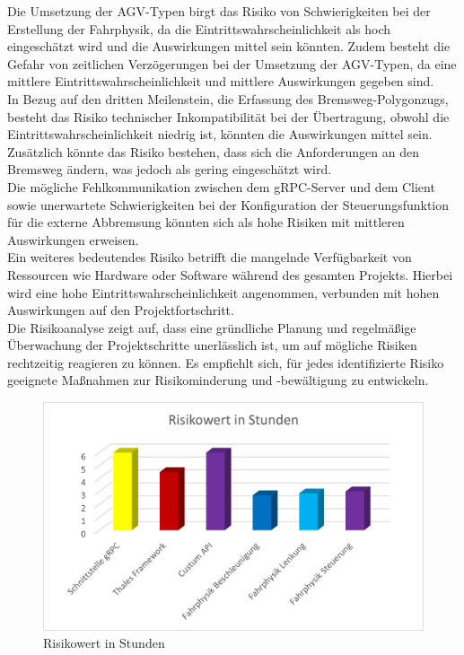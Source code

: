 Die Umsetzung der AGV-Typen birgt das Risiko von Schwierigkeiten bei der Erstellung der Fahrphysik, da die Eintrittswahrscheinlichkeit als hoch eingeschätzt wird und die Auswirkungen mittel sein könnten. Zudem besteht die Gefahr von zeitlichen Verzögerungen bei der Umsetzung der AGV-Typen, da eine mittlere Eintrittswahrscheinlichkeit und mittlere Auswirkungen gegeben sind.\\

In Bezug auf den dritten Meilenstein, die Erfassung des Bremsweg-Polygonzugs, besteht das Risiko technischer Inkompatibilität bei der Übertragung, obwohl die Eintrittswahrscheinlichkeit niedrig ist, könnten die Auswirkungen mittel sein. Zusätzlich könnte das Risiko bestehen, dass sich die Anforderungen an den Bremsweg ändern, was jedoch als gering eingeschätzt wird.\\

Die mögliche Fehlkommunikation zwischen dem gRPC-Server und dem Client sowie unerwartete Schwierigkeiten bei der Konfiguration der Steuerungsfunktion für die externe Abbremsung könnten sich als hohe Risiken mit mittleren Auswirkungen erweisen.\\

Ein weiteres bedeutendes Risiko betrifft die mangelnde Verfügbarkeit von Ressourcen wie Hardware oder Software während des gesamten Projekts. Hierbei wird eine hohe Eintrittswahrscheinlichkeit angenommen, verbunden mit hohen Auswirkungen auf den Projektfortschritt.\\

Die Risikoanalyse zeigt auf, dass eine gründliche Planung und regelmäßige Überwachung der Projektschritte unerlässlich ist, um auf mögliche Risiken rechtzeitig reagieren zu können. Es empfiehlt sich, für jedes identifizierte Risiko geeignete Maßnahmen zur Risikominderung und -bewältigung zu entwickeln.\\


\begin{figure}[htbp]
    \centering
    \includegraphics[width=(\textwidth)/2]{images/Risikowert.png}
    \caption{Risikowert in Stunden}
    \label{fig:Risikowert in Stunden}
\end{figure}

